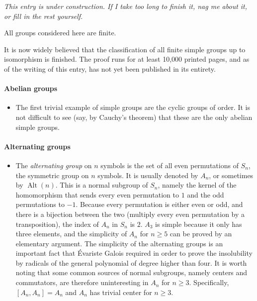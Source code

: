 \documentclass[12pt]{article}
\theoremstyle{definition}
\theoremstyle{definition}
\theoremstyle{definition}
\begin{document}

{\it This entry is under construction.  If I take too long to finish it, nag me about it, or fill in the rest yourself.}

All groups considered here are finite.

It is now widely believed that the classification of all finite simple groups up to isomorphism is finished.  The proof runs for at least 10,000 printed pages, and as of the writing of this entry, has not yet been published in its entirety. 

\paragraph{Abelian groups}
\begin{itemize}
\item
The first trivial example of simple groups are the cyclic groups of  order.  It is not difficult to see (say, by Cauchy's theorem) that these are the only abelian simple groups.
\end{itemize}

\paragraph{Alternating groups}
\begin{itemize}
\item
The \emph{alternating group} on $n$ symbols is the set of all even permutations of $S_n$, the symmetric group on $n$ symbols.  It is usually denoted by $A_n$, or sometimes by $\operatorname{Alt}(n)$. This is a normal subgroup of $S_n$, namely the kernel of the homomorphism that sends every even permutation to $1$ and the odd permutations to $-1$.  Because every permutation is either even or odd, and there is a bijection between the two (multiply every even permutation by a transposition), the index of $A_n$ in $S_n$ is $2$.  $A_3$ is simple because it only has three elements, and the simplicity of $A_n$ for $n \geq 5$ can be proved by an elementary argument.  The simplicity of the alternating groups is an important fact that \'Evariste Galois required in order to prove the insolubility by radicals of the general polynomial of degree higher than four.  It is worth noting that some common sources of normal subgroups, namely centers and commutators, are therefore uninteresting in $A_n$ for $n\geq 3$.  Specifically, $[A_n,A_n]=A_n$ and $A_n$ has trivial center for $n\geq 3$.
\end{itemize}
\end{document}
